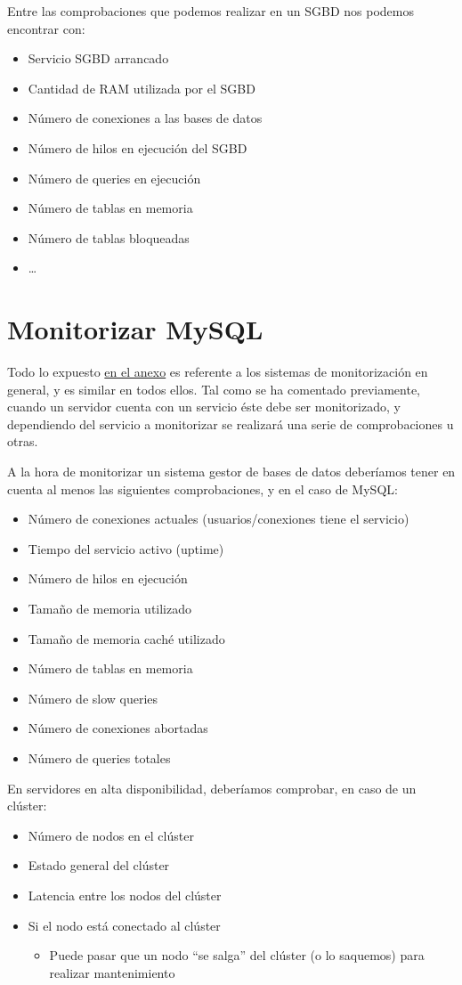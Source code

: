 Entre las comprobaciones que podemos realizar en un SGBD nos podemos encontrar con:
\begin{itemize}
    \item Servicio SGBD arrancado
    \item Cantidad de RAM utilizada por el SGBD
    \item Número de conexiones a las bases de datos
    \item Número de hilos en ejecución del SGBD
    \item Número de queries en ejecución
    \item Número de tablas en memoria
    \item Número de tablas bloqueadas
    \item …

\end{itemize}


\section{Monitorizar MySQL}
Todo lo expuesto \hyperlink{sistemas_de_monitorizacion}{en el anexo} es referente a los sistemas de monitorización en general, y es similar en todos ellos. Tal como se ha comentado previamente, cuando un servidor cuenta con un servicio éste debe ser monitorizado, y dependiendo del servicio a monitorizar se realizará una serie de comprobaciones u otras.

A la hora de monitorizar un sistema gestor de bases de datos deberíamos tener en cuenta al menos las siguientes comprobaciones, y en el caso de MySQL:
\begin{itemize}
    \item Número de conexiones actuales (usuarios/conexiones tiene el servicio)
    \item Tiempo del servicio activo (uptime)
    \item Número de hilos en ejecución
    \item Tamaño de memoria utilizado
    \item Tamaño de memoria caché utilizado
    \item Número de tablas en memoria
    \item Número de slow queries
    \item Número de conexiones abortadas
    \item Número de queries totales
\end{itemize}

En servidores en alta disponibilidad, deberíamos comprobar, en caso de un clúster:
\begin{itemize}
    \item Número de nodos en el clúster
    \item Estado general del clúster
    \item Latencia entre los nodos del clúster
    \item Si el nodo está conectado al clúster
    \begin{itemize}
        \item  Puede pasar que un nodo “se salga” del clúster (o lo saquemos) para realizar mantenimiento
    \end{itemize}
\end{itemize}

